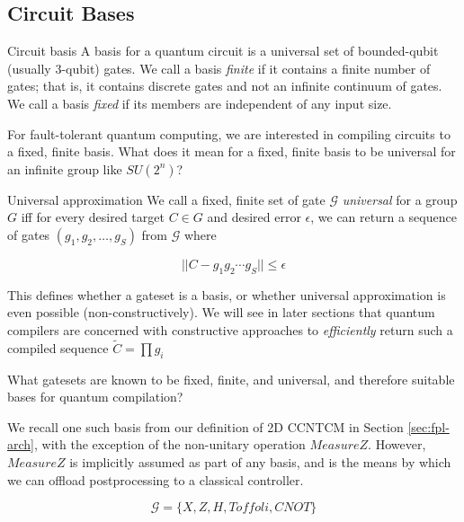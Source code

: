 \subsection{Circuit Bases}
\label{subsec:qcompile-bases}

\begin{definition}{Circuit basis}
A basis for a quantum circuit is a universal set of
bounded-qubit (usually $3$-qubit) gates.
We call a basis \emph{finite} if it contains a finite
number of gates; that is, it contains discrete gates and not an infinite
continuum of gates. We call a basis \emph{fixed} if its members are independent
of any input size.
\end{definition}

For fault-tolerant quantum computing, we are interested in compiling
circuits to a fixed, finite basis. What does it mean for a fixed, finite
basis to be universal for an infinite group like $SU(2^n)$?

\begin{definition}{Universal approximation}
We call a fixed, finite set of gate $\mathcal{G}$ \emph{universal} for
a group $G$ iff for every desired target $C \in G$ and
desired error $\epsilon$, we can return a
sequence of gates $(g_1,g_2,\ldots,g_S)$ from $\mathcal{G}$ where

\begin{equation}
|| C - g_1 g_2 \cdots g_S || \le \epsilon
\end{equation}

\end{definition}

This defines whether a gateset is a basis, or whether universal approximation
is even possible (non-constructively). We will see in later sections that
quantum compilers are concerned with constructive approaches to
\emph{efficiently} return such a compiled sequence $\tilde{C} = \prod g_i$

What gatesets are known to be fixed, finite, and universal, and therefore
suitable bases for quantum compilation?

We recall one such basis from our definition of \textsf{2D CCNTCM} in
Section \ref{sec:fpl-arch}, with the exception of the non-unitary operation
$MeasureZ$. However, $MeasureZ$ is implicitly assumed as part of any basis,
and is the means by which we can offload postprocessing to a classical
controller.

\begin{equation}
\mathcal{G} = \{X, Z, H, Toffoli, CNOT\}
\end{equation}

